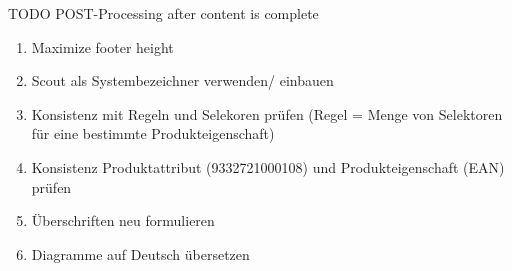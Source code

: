 TODO POST-Processing after content is complete

\begin{enumerate}
    \item Maximize footer height
    \item Scout als Systembezeichner verwenden/ einbauen
    \item Konsistenz mit Regeln und Selekoren prüfen (Regel = Menge von Selektoren für eine bestimmte Produkteigenschaft)
    \item Konsistenz Produktattribut (9332721000108) und Produkteigenschaft (EAN) prüfen
    \item Überschriften neu formulieren
    \item Diagramme auf Deutsch übersetzen
\end{enumerate}